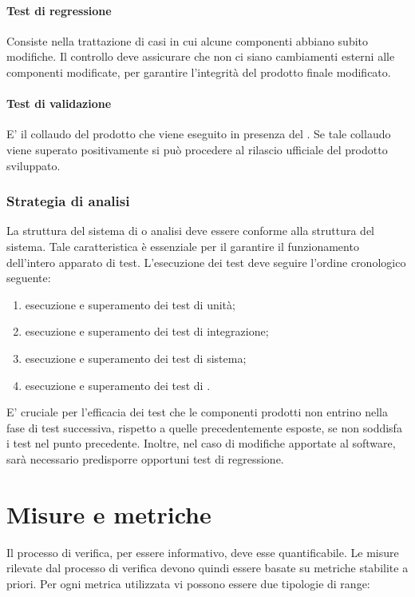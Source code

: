 \documentclass[12pt,a4paper]{article}
\begin{document}
	\paragraph{Test di regressione}
	Consiste nella trattazione di casi in cui alcune componenti abbiano subito modifiche. Il controllo deve assicurare che non ci siano cambiamenti esterni alle componenti modificate, per garantire l'integrità del prodotto finale modificato.
	
	\paragraph{Test di validazione}
	E' il collaudo del prodotto  che viene eseguito in presenza del . Se tale collaudo viene superato positivamente si può procedere al rilascio ufficiale del prodotto sviluppato. 
	
	\subsubsection{Strategia di analisi}
	La struttura del sistema di  o analisi deve essere conforme alla struttura del sistema. Tale caratteristica è essenziale per il garantire il funzionamento dell'intero apparato di test. L'esecuzione dei test deve seguire l'ordine cronologico seguente:
	
	\begin{enumerate}
		\item esecuzione e superamento dei test di unità;
		\item esecuzione e superamento dei test di integrazione;
		\item esecuzione e superamento dei test di sistema;
		\item esecuzione e superamento dei test di .
	\end{enumerate}
	
	E' cruciale per l'efficacia dei test che le componenti prodotti non entrino nella fase di test successiva, rispetto a quelle precedentemente esposte, se non soddisfa i test nel punto precedente.
	Inoltre, nel caso di modifiche apportate al software, sarà necessario predisporre opportuni test di regressione.
	\newpage
	
	\section{Misure e metriche}\label{metriche}
	Il processo di verifica, per essere informativo, deve esse quantificabile. Le misure rilevate dal processo di verifica devono quindi essere basate su metriche stabilite a priori. Per ogni metrica utilizzata vi possono essere due tipologie di range:
	
\end{document}
